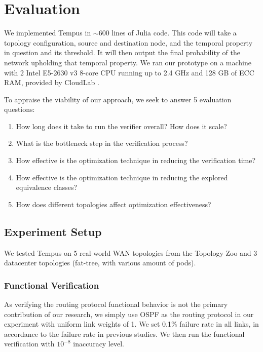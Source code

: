 \section{Evaluation} \label{eval}

We implemented Tempus in $\sim600$ lines of Julia \cite{julia} code.
This code will take a topology configuration, source and destination node, and the 
temporal property in question and its threshold.
It will then output the final probability of the network upholding that temporal property.
We ran our prototype on a machine with 2 Intel E5-2630 v3 8-core CPU running up to 2.4 GHz 
and 128 GB of ECC RAM, provided by CloudLab \cite{cloudlab}.

To appraise the viability of our approach, we seek to answer 5 evaluation questions:
\begin{enumerate}
    \item How long does it take to run the verifier overall? How does it scale?
    \item What is the bottleneck step in the verification process?
    \item How effective is the optimization technique in reducing the verification time?
    \item How effective is the optimization technique in reducing the explored equivalence classes?
    \item How does different topologies affect optimization effectiveness?
\end{enumerate}

\subsection{Experiment Setup}



We tested Tempus on 5 real-world WAN topologies from the Topology Zoo and 3 datacenter topologies 
(fat-tree, with various amount of pods).

\subsubsection{Functional Verification}
As verifying the routing protocol functional behavior is not the primary contribution of our research, 
we simply use OSPF as the routing protocol in our experiment with uniform link weights of 1.
We set 0.1\% failure rate in all links, in accordance to the failure rate in previous studies. %
We then run the functional verification with $10^{-8}$ inaccuracy level.

